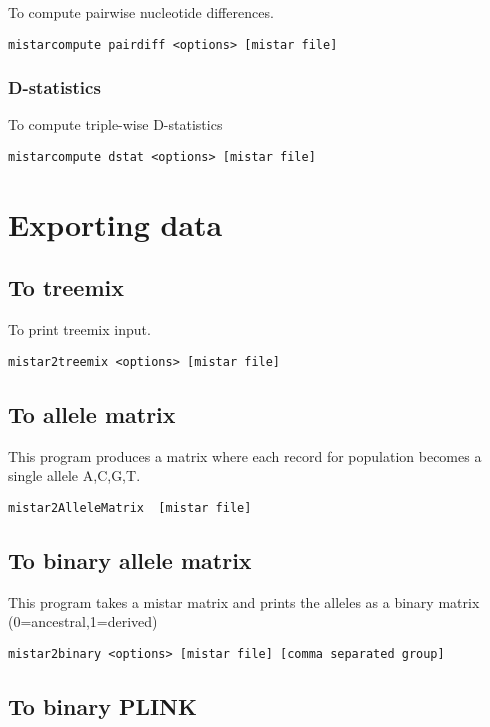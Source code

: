 \documentclass[a4paper]{article}
\begin{document}
To compute pairwise nucleotide differences.
\begin{verbatim}
mistarcompute pairdiff <options> [mistar file]
\end{verbatim}

\subsubsection{D-statistics}
To compute triple-wise D-statistics
\begin{verbatim}
mistarcompute dstat <options> [mistar file]
\end{verbatim}


\section{Exporting data}
\subsection{To treemix}

To print treemix input.
\begin{verbatim}
mistar2treemix <options> [mistar file]
\end{verbatim}

\subsection{To allele matrix}

This program produces a matrix where each record for population becomes a single allele {A,C,G,T}.
\begin{verbatim}
mistar2AlleleMatrix  [mistar file]
\end{verbatim}


\subsection{To binary allele matrix}

This program takes a mistar matrix and prints the alleles as a binary matrix (0=ancestral,1=derived)

\begin{verbatim}
mistar2binary <options> [mistar file] [comma separated group]
\end{verbatim}

\subsection{To binary PLINK}
\end{document}
